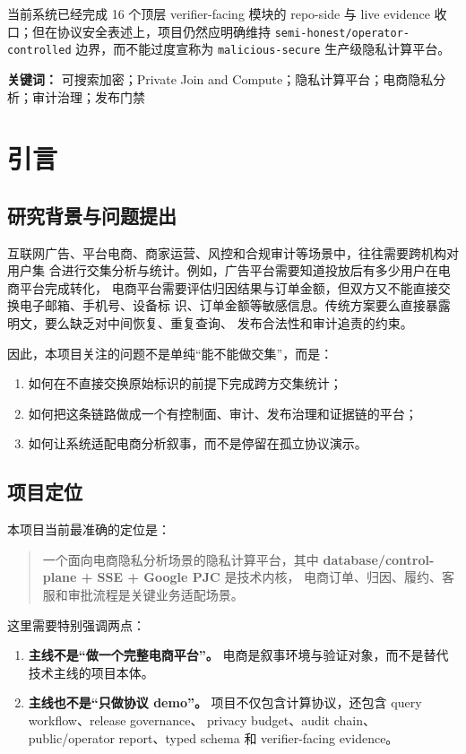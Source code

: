 \documentclass[UTF8,a4paper,12pt,oneside]{ctexrep}
\begin{document}
当前系统已经完成 16 个顶层 verifier-facing 模块的 repo-side 与 live evidence
收口；但在协议安全表述上，项目仍然应明确维持
\texttt{semi-honest/operator-controlled} 边界，而不能过度宣称为
\texttt{malicious-secure} 生产级隐私计算平台。

\noindent\textbf{关键词：} 可搜索加密；Private Join and Compute；隐私计算平台；电商隐私分析；审计治理；发布门禁

\tableofcontents
\clearpage
{}

\chapter{引言}

\section{研究背景与问题提出}

互联网广告、平台电商、商家运营、风控和合规审计等场景中，往往需要跨机构对用户集
合进行交集分析与统计。例如，广告平台需要知道投放后有多少用户在电商平台完成转化，
电商平台需要评估归因结果与订单金额，但双方又不能直接交换电子邮箱、手机号、设备标
识、订单金额等敏感信息。传统方案要么直接暴露明文，要么缺乏对中间恢复、重复查询、
发布合法性和审计追责的约束。

因此，本项目关注的问题不是单纯“能不能做交集”，而是：

\begin{enumerate}
  \item 如何在不直接交换原始标识的前提下完成跨方交集统计；
  \item 如何把这条链路做成一个有控制面、审计、发布治理和证据链的平台；
  \item 如何让系统适配电商分析叙事，而不是停留在孤立协议演示。
\end{enumerate}

\section{项目定位}

本项目当前最准确的定位是：

\begin{quote}
一个面向电商隐私分析场景的隐私计算平台，其中
\textbf{database/control-plane + SSE + Google PJC} 是技术内核，
电商订单、归因、履约、客服和审批流程是关键业务适配场景。
\end{quote}

这里需要特别强调两点：

\begin{enumerate}
  \item \textbf{主线不是“做一个完整电商平台”。}
  电商是叙事环境与验证对象，而不是替代技术主线的项目本体。
  \item \textbf{主线也不是“只做协议 demo”。}
  项目不仅包含计算协议，还包含 query workflow、release governance、
  privacy budget、audit chain、public/operator report、typed schema 和 verifier-facing evidence。
\end{enumerate}
\end{document}
